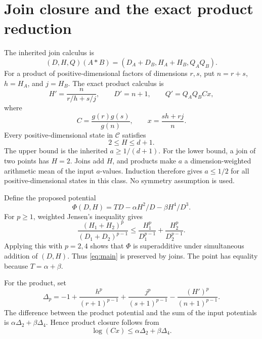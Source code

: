 \documentclass[11pt]{article}
\theoremstyle{remark}
\newcommand{\CC}{\mathcal C}
\begin{document}
\section{Join closure and the exact product reduction}

The inherited join calculus is
\begin{equation}\label{eq:join}
 (D,H,Q)(A*B)=(D_A+D_B,H_A+H_B,Q_AQ_B).
\end{equation}
For a product of positive-dimensional factors of dimensions $r,s$, put $n=r+s$, $h=H_A$, and $j=H_B$. The exact product calculus is
\begin{equation}\label{eq:product}
 H'=\frac{n}{r/h+s/j},\qquad D'=n+1,\qquad
 Q'=Q_AQ_BCx,
\end{equation}
where
\begin{equation}\label{eq:Cx}
 C=\frac{g(r)g(s)}{g(n)},\qquad x=\frac{sh+rj}{n}.
\end{equation}
Every positive-dimensional state in $\CC$ satisfies
\begin{equation}\label{eq:statebox}
 2\le H\le d+1.
\end{equation}
The upper bound is the inherited $a\ge1/(d+1)$. For the lower bound, a join of two points has $H=2$. Joins add $H$, and products make $a$ a dimension-weighted arithmetic mean of the input $a$-values. Induction therefore gives $a\le1/2$ for all positive-dimensional states in this class. No symmetry assumption is used.

Define the proposed potential
\[
 \Phi(D,H)=TD-\alpha H^2/D-\beta H^4/D^3.
\]
For $p\ge1$, weighted Jensen's inequality gives
\begin{equation}\label{eq:perspective}
 \frac{(H_1+H_2)^p}{(D_1+D_2)^{p-1}}
 \le\frac{H_1^p}{D_1^{p-1}}+\frac{H_2^p}{D_2^{p-1}}.
\end{equation}
Applying this with $p=2,4$ shows that $\Phi$ is superadditive under simultaneous addition of $(D,H)$. Thus \eqref{eq:main} is preserved by joins. The point has equality because $T=\alpha+\beta$.

For the product, set
\[
 \Delta_p=-1+\frac{h^p}{(r+1)^{p-1}}+
 \frac{j^p}{(s+1)^{p-1}}-\frac{(H')^p}{(n+1)^{p-1}}.
\]
The difference between the product potential and the sum of the input potentials is $\alpha\Delta_2+\beta\Delta_4$. Hence product closure follows from
\begin{equation}\label{eq:exactcondition}
 \log(Cx)\le\alpha\Delta_2+\beta\Delta_4.
\end{equation}
\end{document}
